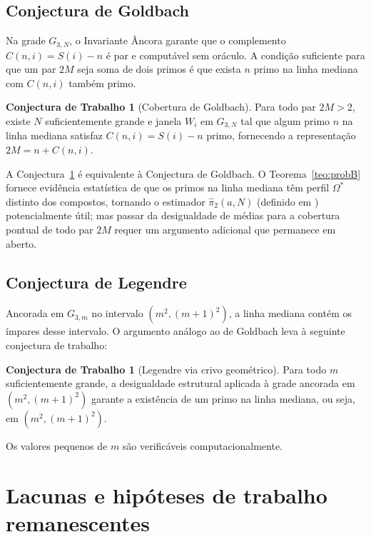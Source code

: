 \documentclass[12pt]{article}
\theoremstyle{definition}
\newtheorem{conjectura}[teorema]{Conjectura de Trabalho}
\theoremstyle{remark}
\newcommand{\Omstar}{\Omega^*}
\begin{document}
	\subsection{Conjectura de Goldbach}
	
	Na grade $G_{3,N}$, o Invariante Âncora garante que o complemento
	$C(n,i)=S(i)-n$ é par e computável sem oráculo.
	A condição suficiente para que um par $2M$ seja soma de dois primos é que exista $n$ primo na
	linha mediana com $C(n,i)$ também primo.
	
	\begin{conjectura}[Cobertura de Goldbach]\label{conj:goldbach}
		Para todo par $2M>2$, existe $N$ suficientemente grande e janela $W_i$
		em $G_{3,N}$ tal que algum primo $n$ na linha mediana satisfaz
		$C(n,i)=S(i)-n$ primo, fornecendo a representação $2M=n+C(n,i)$.
	\end{conjectura}
	
	A Conjectura~\ref{conj:goldbach} é equivalente à Conjectura de Goldbach.
	O Teorema~\ref{teo:probB} fornece evidência estatística de que os primos
	na linha mediana têm perfil $\Omstar$ distinto dos compostos, tornando o
	estimador $\hat\pi_2(a,N)$ (definido em \cite{bandeira3}) potencialmente útil;
	mas passar da desigualdade de médias para a cobertura pontual de
	todo par $2M$ requer um argumento adicional que permanece em aberto.
	
	\subsection{Conjectura de Legendre}
	
	Ancorada em $G_{3,m}$ no intervalo $(m^2,(m+1)^2)$, a linha mediana
	contém os ímpares desse intervalo.
	O argumento análogo ao de Goldbach leva à seguinte conjectura de trabalho:
	
	\begin{conjectura}[Legendre via crivo geométrico]\label{conj:legendre}
		Para todo $m$ suficientemente grande, a desigualdade estrutural
		aplicada à grade ancorada em $(m^2,(m+1)^2)$ garante a existência de
		um primo na linha mediana, ou seja, em $(m^2,(m+1)^2)$.
	\end{conjectura}
	
	Os valores pequenos de $m$ são verificáveis computacionalmente.
	
	\section{Lacunas e hipóteses de trabalho remanescentes}
	\label{sec:lacunas}
	
\end{document}
